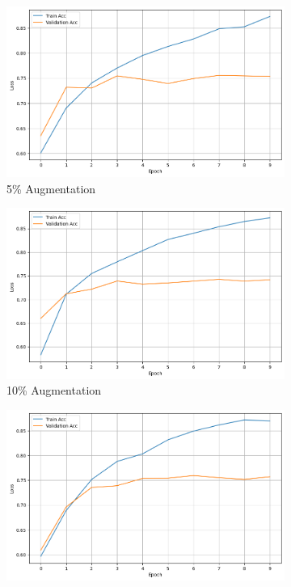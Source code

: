 \documentclass[10pt]{extarticle}
\begin{document}
\begin{figure}[ht]
  \centering
  \begin{subfigure}[b]{0.3\textwidth}
    \includegraphics[width=\textwidth]{img/synonym_5.png}
    \caption{5\% Augmentation}
    \label{fig:synonym_5}
  \end{subfigure}
  \hfill
  \begin{subfigure}[b]{0.3\textwidth}
    \includegraphics[width=\textwidth]{img/synonym_10.png}
    \caption{10\% Augmentation}
    \label{fig:synonym_10}
  \end{subfigure}
  \hfill
  \begin{subfigure}[b]{0.3\textwidth}
    \includegraphics[width=\textwidth]{img/synonym_20.png}

\end{subfigure}
\end{figure}
\end{document}
